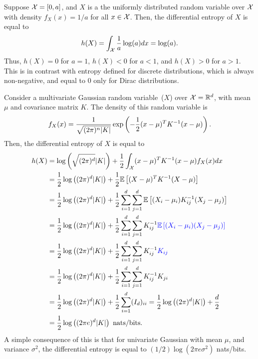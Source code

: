         \begin{example}
            \label{example:diff-ent-uniform}
            Suppose $\mathcal{X} = [0, a]$, and $X$ is a the uniformly distributed random variable over $\mathcal{X}$ with density $f_X(x) = 1/a$ for all $x \in \mathcal{X}$. Then, the  differential entropy of $X$ is equal to 
            \begin{align}
                h(X) = \int_{\mathcal{X}} \frac{1}{a} \log(a) dx = \log(a). 
            \end{align}
            Thus, $h(X)=0$ for $a=1$, $h(X)<0$ for $a<1$, and $h(X)>0$ for $a>1$. This is in contrast with entropy defined for discrete distributions, which is always non-negative, and equal to $0$ only for Dirac distributions.  
        \end{example}

        \begin{example}
            \label{example:diff-ent-gaussian} 
            Consider a multivariate Gaussian random variable~($X$) over $\mathcal{X} = \mathbb{R}^d$, with mean $\mu$ and covariance matrix $K$. The density of this random variable is 
            \begin{align}
                f_X(x) = \frac{1}{\sqrt{(2\pi)^n |K|}} \exp\left( - \frac{1}{2} (x-\mu)^TK^{-1}(x-\mu) \right). 
            \end{align}
            Then, the differential entropy of $X$ is equal to 
            \begin{align}
                h(X)  &=  \log \left( \sqrt{(2\pi)^d} |K| \right) + \frac{1}{2}\int_{\mathcal{X}} (x-\mu)^{T} K^{-1} (x-\mu)f_X(x) dx\\
                &=  \frac{1}{2}\log \left( (2\pi)^d |K| \right) + \frac{1}{2} \mathbb{E}\left[ (X-\mu)^{T} K^{-1} (X-\mu) \right] \\
                &= \frac{1}{2}\log \left( (2\pi)^d |K| \right) + \frac{1}{2} \sum_{i=1}^d \sum_{j=1}^d \mathbb{E}\left[ (X_i - \mu_i)K^{-1}_{ij}(X_j-\mu_j)  \right] \\
                &= \frac{1}{2}\log \left( (2\pi)^d |K| \right) + \frac{1}{2} \sum_{i=1}^d \sum_{j=1}^d K^{-1}_{ij}\textcolor{blue}{\mathbb{E}\left[ (X_i - \mu_i)(X_j-\mu_j)  \right]}  \\
                &= \frac{1}{2}\log \left( (2\pi)^d |K| \right) +  \frac{1}{2} \sum_{i=1}^d \sum_{j=1}^d K^{-1}_{ij}\textcolor{blue}{K_{ij}}  \\
                &= \frac{1}{2}\log \left( (2\pi)^d |K| \right) + \frac{1}{2} \sum_{i=1}^d \sum_{j=1}^d K^{-1}_{ij}K_{ji}  \\
                &=  \frac{1}{2}\log \left( (2\pi)^d |K| \right) + \frac{1}{2} \sum_{i=1}^d (I_d)_{ii} 
                = \frac{1}{2}\log \left( (2\pi)^d |K| \right) + \frac{d}{2}  \\
                & =  \frac{1}{2} \log \left( (2\pi e)^d |K| \right) \text{ nats/bits}. 
            \end{align}
            A simple consequence of this is that for univariate Gaussian with mean $\mu$, and variance $\sigma^2$, the differential entropy is equal to $(1/2) \log (2\pi e \sigma^2)$ nats/bits.
        \end{example}

